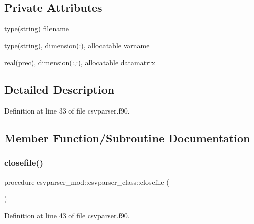 \subsection*{Private Attributes}
\begin{DoxyCompactItemize}
\item 
type(string) \mbox{\hyperlink{structcsvparser__mod_1_1csvparser__class_aa3632225cd36ea1ad9e8c0493a218886}{filename}}
\item 
type(string), dimension(\+:), allocatable \mbox{\hyperlink{structcsvparser__mod_1_1csvparser__class_acad38d37d73d0cb6ca80f98cde3d56b4}{varname}}
\item 
real(prec), dimension(\+:,\+:), allocatable \mbox{\hyperlink{structcsvparser__mod_1_1csvparser__class_afb06725049484011f39d9183adc9d192}{datamatrix}}
\end{DoxyCompactItemize}


\subsection{Detailed Description}


Definition at line 33 of file csvparser.\+f90.



\subsection{Member Function/\+Subroutine Documentation}
\mbox{\label{structcsvparser__mod_1_1csvparser__class_a1daa0b05831e325af862044831d5aade}} 
\subsubsection{\texorpdfstring{closefile()}{closefile()}}
{\footnotesize\ttfamily procedure csvparser\+\_\+mod\+::csvparser\+\_\+class\+::closefile (\begin{DoxyParamCaption}{ }\end{DoxyParamCaption})\hspace{0.3cm}{\ttfamily [private]}}



Definition at line 43 of file csvparser.\+f90.

